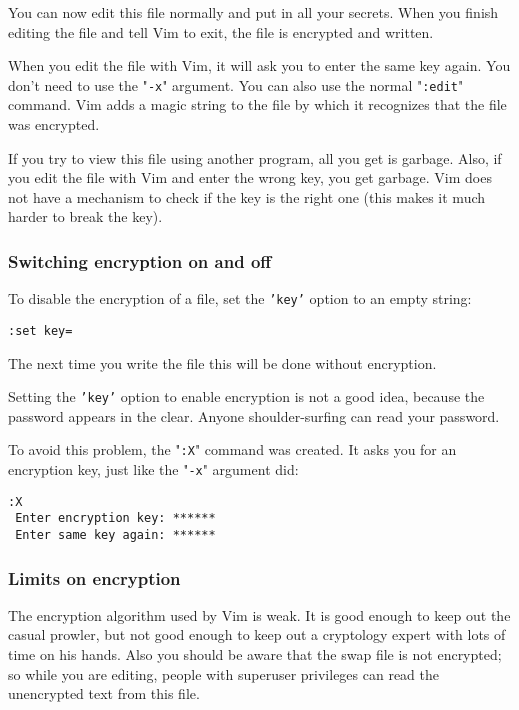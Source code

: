 You can now edit this file normally and put in all your secrets.
When you finish editing the file and tell Vim to exit, the file is encrypted and written.

When you edit the file with Vim, it will ask you to enter the same key again.
You don't need to use the "\texttt{-x}" argument.
You can also use the normal "\texttt{:edit}" command.
Vim adds a magic string to the file by which it recognizes that the file was encrypted.

If you try to view this file using another program, all you get is garbage.
Also, if you edit the file with Vim and enter the wrong key, you get garbage.
Vim does not have a mechanism to check if the key is the right one (this makes it much harder to break the key).
\subsubsection{Switching encryption on and off}
To disable the encryption of a file, set the \texttt{'key'} option to an empty string:

\begin{Verbatim}[samepage=true]
 :set key=
\end{Verbatim}

The next time you write the file this will be done without encryption.

Setting the \texttt{'key'} option to enable encryption is not a good idea, because the password appears in the clear.
Anyone shoulder-surfing can read your password.

To avoid this problem, the "\texttt{:X}" command was created.
It asks you for an encryption key, just like the "\texttt{-x}" argument did:

\begin{Verbatim}[samepage=true]
 :X
 Enter encryption key: ******
 Enter same key again: ******
\end{Verbatim}

\subsubsection{Limits on encryption}
The encryption algorithm used by Vim is weak.
It is good enough to keep out the casual prowler, but not good enough to keep out a cryptology expert with lots of time on his hands.
Also you should be aware that the swap file is not encrypted; so while you are editing, people with superuser privileges can read the unencrypted text from this file.

